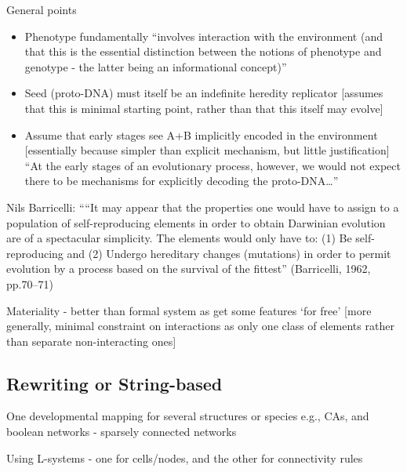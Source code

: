 	
	General points
		
	\begin{itemize}

		\item
		
		Phenotype fundamentally ``involves interaction with the environment
		(and that this is the essential distinction between the notions of
		phenotype and genotype - the latter being an informational
		concept)''
		
		\item
		
		Seed (proto-DNA) must itself be an indefinite heredity replicator
		{[}assumes that this is minimal starting point, rather than that
		this itself may evolve{]}
		
		\item
		
		Assume that early stages see A+B implicitly encoded in the
		environment {[}essentially because simpler than explicit mechanism,
		but little justification{]} ``At the early stages of an evolutionary
		process, however, we would not expect there to be mechanisms for
		explicitly decoding the proto-DNA\ldots{}''
		
	\end{itemize}

	
	Nils Barricelli: ````It may appear that the properties one would have
	to assign to a population of self-reproducing elements in order to
	obtain Darwinian evolution are of a spectacular simplicity. The
	elements would only have to: (1) Be self-reproducing and (2) Undergo
	hereditary changes (mutations) in order to permit evolution by a
	process based on the survival of the fittest'' (Barricelli, 1962,
	pp.70--71)

	
	Materiality - better than formal system as get some features `for
	free' {[}more generally, minimal constraint on interactions as only
	one class of elements rather than separate non-interacting ones{]}

		
\subsection{Rewriting or String-based}
		
\autocite{Antonakopoulos:2011th}
		

			One developmental mapping for several structures or species e.g., CAs,
			and boolean networks - sparsely connected networks

			
			Using L-systems - one for cells/nodes, and the other for connectivity
			rules

